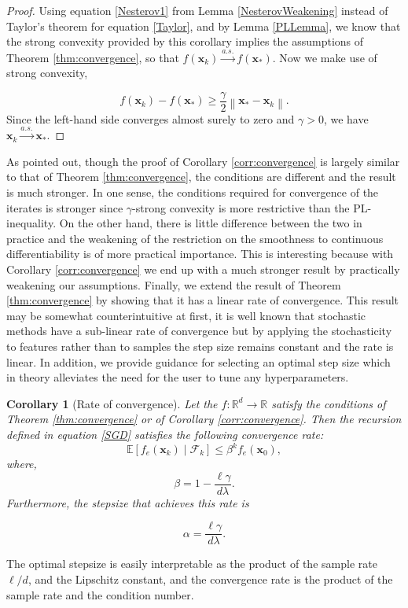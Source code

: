 \documentclass[11pt] {article}
\newcommand{\norm}[1]{\left\lVert#1\right\rVert}
\newcommand{\x}{\pmb{x}}
\newcommand{\Expectation}{\mathbb{E}}
\newcommand{\convas}{\overset{a.s.}{\longrightarrow}}
\newcommand{\reals}{\mathbb{R}}
\newtheorem{corollary}{Corollary}
\begin{document}
\begin{proof}
Using equation \eqref{Nesterov1} from Lemma \ref{NesterovWeakening} instead of Taylor's theorem for equation \eqref{Taylor}, and by Lemma \ref{PLLemma}, we know that the strong convexity provided by this corollary implies the assumptions of Theorem \ref{thm:convergence}, so that $f(\x_k) \convas f(\x_*)$. Now we make use of strong convexity, 
 
 \begin{equation*}
 f(\x_k) - f(\x_*) \geq \frac{\gamma}{2} \norm{\x_*-\x_k}.
 \end{equation*}
% 
 Since the left-hand side converges almost surely to zero and $\gamma > 0$, we have $\x_k \convas \x_*$.
\end{proof}
%
As pointed out, though the proof of Corollary \ref{corr:convergence} is largely similar to that of Theorem \ref{thm:convergence}, the conditions are different and the result is much stronger. In one sense, the conditions required for convergence of the iterates is stronger since $\gamma$-strong convexity is more restrictive than the PL-inequality. On the other hand, there is little difference between the two in practice and the weakening of the restriction on the smoothness to continuous differentiability is of more practical importance. This is interesting because with Corollary \ref{corr:convergence} we end up with a much stronger result by practically weakening our assumptions.
%
Finally, we extend the result of Theorem \ref{thm:convergence} by showing that it has a linear rate of convergence. This result may be somewhat counterintuitive at first, it is well known that stochastic methods have a sub-linear rate of convergence but by applying the stochasticity to features rather than to samples the step size remains constant and the rate is linear. In addition, we provide guidance for selecting an optimal step size which in theory alleviates the need for the user to tune any hyperparameters. 

\begin{corollary}[Rate of convergence]\label{corr:rate}
	Let the $f:\reals^d \to \reals$ satisfy the conditions of Theorem \ref{thm:convergence} \emph{or} of Corollary \ref{corr:convergence}. Then the recursion defined in equation \eqref{SGD} satisfies the following convergence rate:
	\begin{equation}
	\Expectation \left[f_e(\x_k) \mid \mathcal{F}_k\right] \leq \beta^k f_e(\x_0) ,
	\end{equation}
	where,
	\begin{equation*}
	\beta = 1 - \frac{\ell \gamma}{d \lambda }.
	\end{equation*}
	Furthermore, the stepsize that achieves this rate is 
	
	\begin{equation*}
	\alpha = \frac{\ell\gamma}{d\lambda}.
	\end{equation*}
\end{corollary}
%
The optimal stepsize is easily interpretable as the product of the sample rate $\ell/d$, and the Lipschitz constant, and the convergence rate is the product of the sample rate and the condition number. 
\end{document}
